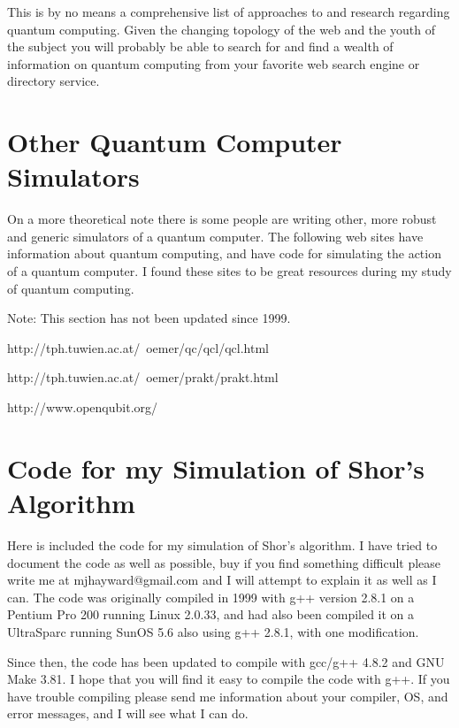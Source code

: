 \documentclass[]{article}
\begin{document}
This is by no means a comprehensive list of approaches to and research
regarding quantum computing.  Given the changing topology of the web
and the youth of the subject you will probably be able to search for
and find a wealth of information on quantum computing from your
favorite web search engine or directory service.
	

\section{Other Quantum Computer Simulators}

On a more theoretical note there is some people are writing other,
more robust and generic simulators of a quantum computer.  The
following web sites have information about quantum computing, and have
code for simulating the action of a quantum computer.  I found these
sites to be great resources during my study of quantum computing.

Note: This section has not been updated since 1999.

	http://tph.tuwien.ac.at/~oemer/qc/qcl/qcl.html

	http://tph.tuwien.ac.at/~oemer/prakt/prakt.html

	http://www.openqubit.org/
	
\section{Code for my Simulation of Shor's Algorithm}

Here is included the code for my simulation of Shor's algorithm.  I
have tried to document the code as well as possible, buy if you find
something difficult please write me at mjhayward@gmail.com and I will
attempt to explain it as well as I can.  The code was originally
compiled in 1999 with g++ version 2.8.1 on a Pentium Pro 200 running
Linux 2.0.33, and had also been compiled it on a UltraSparc running
SunOS 5.6 also using g++ 2.8.1, with one modification.  

Since then, the code has been updated to compile with gcc/g++ 4.8.2
and GNU Make 3.81.  I hope that you will find it easy to compile the
code with g++.  If you have trouble compiling please send me
information about your compiler, OS, and error messages, and I will
see what I can do.
\end{document}
